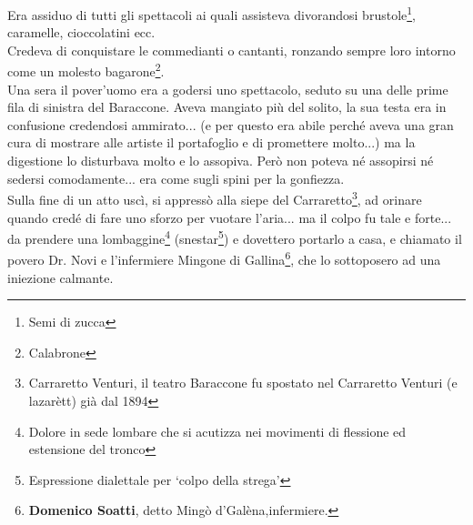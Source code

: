 Era assiduo di tutti gli spettacoli ai quali assisteva divorandosi brustole\footnote{Semi di zucca}, caramelle, cioccolatini ecc.\\
\indent Credeva di conquistare le commedianti o cantanti, ronzando sempre loro intorno come un molesto bagarone\footnote{Calabrone}.\\
\indent Una sera il pover'uomo era a godersi uno spettacolo, seduto su una delle prime fila di sinistra del Baraccone. Aveva mangiato più del solito, la sua testa era in confusione credendosi ammirato... (e per questo era abile perché aveva una gran cura di mostrare alle artiste il portafoglio e di promettere molto...) ma la digestione lo disturbava molto e lo assopiva. Però non poteva né assopirsi né sedersi comodamente... era come sugli spini per la gonfiezza.\\
\indent Sulla fine di un atto uscì, si appressò alla siepe del Carraretto\footnote{Carraretto Venturi, il teatro Baraccone fu spostato nel Carraretto Venturi (e lazarètt) già dal 1894}, ad orinare quando credé di fare uno sforzo per vuotare l'aria... ma il colpo fu tale e forte... da prendere una lombaggine\footnote{Dolore in sede lombare che si acutizza nei movimenti di flessione ed estensione del tronco} (snestar\footnote{Espressione dialettale per `colpo della strega'}) e dovettero portarlo a casa, e chiamato il povero Dr. Novi e l'infermiere Mingone di Gallina\footnote{\textbf{Domenico Soatti}, detto Mingò d'Galèna,infermiere.}, che lo sottoposero ad una iniezione calmante.\\

